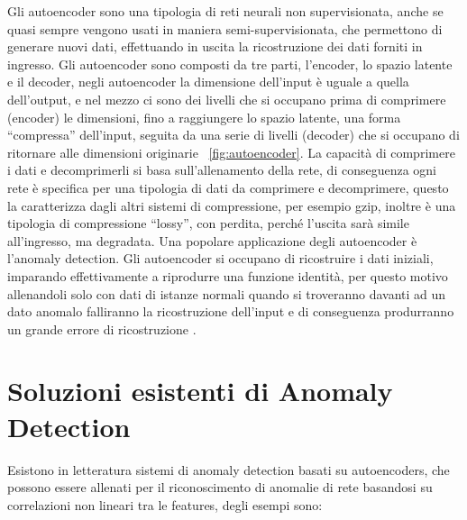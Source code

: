 

Gli autoencoder sono una tipologia di reti neurali non supervisionata, anche se quasi sempre vengono usati in maniera semi-supervisionata, che permettono di generare nuovi dati, effettuando in uscita la ricostruzione dei dati forniti in ingresso.
Gli autoencoder sono composti da tre parti, l'encoder, lo spazio latente e il decoder, negli autoencoder la dimensione dell'input è uguale a quella dell'output, e nel mezzo ci sono dei livelli che si occupano prima di comprimere (encoder) le dimensioni, fino a raggiungere lo spazio latente, una forma ``compressa'' dell'input, seguita da una serie di livelli (decoder) che si occupano di ritornare alle dimensioni originarie ~\ref{fig:autoencoder}.
La capacità di comprimere i dati e decomprimerli si basa sull'allenamento della rete, di conseguenza ogni rete è specifica per una tipologia di dati da comprimere e decomprimere, questo la caratterizza dagli altri sistemi di compressione, per esempio gzip, inoltre è una tipologia di compressione ``lossy'', con perdita, perché l'uscita sarà simile all'ingresso, ma degradata.
Una popolare applicazione degli autoencoder è l'anomaly detection. Gli autoencoder si occupano di ricostruire i dati iniziali, imparando effettivamente a riprodurre una funzione identità, per questo motivo allenandoli solo con dati di istanze normali quando si troveranno davanti ad un dato anomalo falliranno la ricostruzione dell'input e di conseguenza produrranno un grande errore di ricostruzione \cite{anomaly_detection_survey_2_deep_learning}. 


\section{Soluzioni esistenti di Anomaly Detection}

Esistono in letteratura sistemi di anomaly detection basati su autoencoders, che possono essere allenati per il riconoscimento di anomalie di rete basandosi su correlazioni non lineari tra le features, degli esempi sono:

